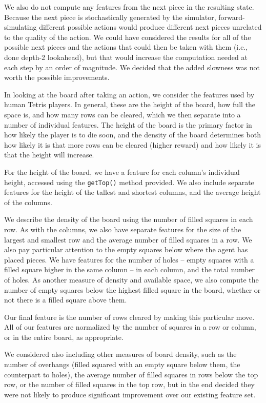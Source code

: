 \documentclass[11pt]{article}
\begin{document}
We also do not compute any features from the next piece in the resulting state.  Because the next piece is stochastically generated by the simulator, forward-simulating different possible actions would produce different next pieces unrelated to the quality of the action.  We could have considered the results for all of the possible next pieces and the actions that could then be taken with them (i.e., done depth-2 lookahead), but that would increase the computation needed at each step by an order of magnitude.  We decided that the added slowness was not worth the possible improvements.

In looking at the board after taking an action, we consider the features used by human Tetris players.  In general, these are the height of the board, how full the space is, and how many rows can be cleared, which we then separate into a number of individual features.  The height of the board is the primary factor in how likely the player is to die soon, and the density of the board determines both how likely it is that more rows can be cleared (higher reward) and how likely it is that the height will increase.

For the height of the board, we have a feature for each column's individual height, accessed using the \texttt{getTop()} method provided.  We also include separate features for the height of the tallest and shortest columns, and the average height of the columns.

We describe the density of the board using the number of filled squares in each row.  As with the columns, we also have separate features for the size of the largest and smallest row and the average number of filled squares in a row.  We also pay particular attention to the empty squares below where the agent has placed pieces.  We have features for the number of holes -- empty squares with a filled square higher in the same column -- in each column, and the total number of holes.  As another measure of density and available space, we also compute the number of empty squares below the highest filled square in the board, whether or not there is a filled square above them. 

Our final feature is the number of rows cleared by making this particular move.  All of our features are normalized by the number of squares in a row or column, or in the entire board, as appropriate.

We considered also including other measures of board density, such as the number of overhangs (filled squared with an empty square below them, the counterpart to holes), the average number of filled squares in rows below the top row, or the number of filled squares in the top row, but in the end decided they were not likely to produce significant improvement over our existing feature set.
\end{document}
